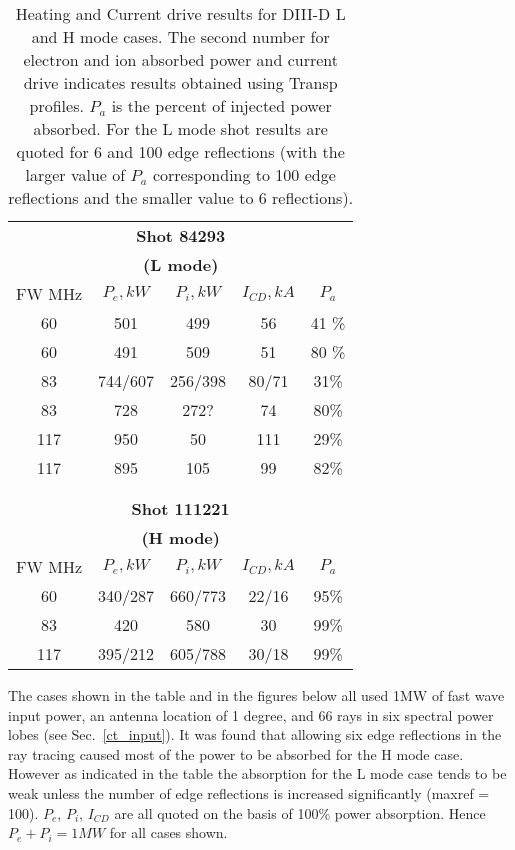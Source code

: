 \begin{table}
\begin{centering}
\begin{tabular}{ccccc}
\multicolumn{5}{c}{\bfseries Shot 84293} \\
\multicolumn{5}{c}{\bfseries (L mode) }  \\ 
FW MHz& $P_e ,kW $ & $P_i, kW  $ & $ I_{CD}, kA  $ & $P_a $ \\ \hline
60  & 501& 499 & 56& 41 \%  \\
60  & 491& 509 & 51& 80 \%  \\
83  & 744/607& 256/398  &  80/71 & 31\%   \\
83  & 728 & 272?   &  74 & 80\%   \\
117  &950  &50 & 111 & 29\%  \\
117  &895  &105 & 99 & 82\%  \\
\\ \hline
& \\
\multicolumn{5}{c}{\bfseries Shot 111221} \\
\multicolumn{5}{c}{\bfseries (H
  mode)} \\ 
FW MHz& $P_e, kW$ & $P_i ,kW $ & $ I_{CD}, kA $&  $P_a $ \\ \hline
60  &340/287& 660/773 & 22/16 & 95\% \\
83  & 420 & 580 & 30  & 99\% \\
117 & 395/212 & 605/788 & 30/18 & 99\% \\ \hline
\end{tabular}
\caption{Heating and Current drive results for DIII-D L and H
  mode cases. The second number for electron and ion absorbed power and
  current drive indicates results obtained using Transp
  profiles. $P_a$ is the percent of injected power absorbed. For the
L mode shot results are quoted for 6  and 100 edge reflections (with
the larger value of $P_a$ corresponding to 100 edge reflections and
the smaller value to 6 reflections).}
\label{t1}
\end{centering}
\end{table} 

The cases  shown in the table and in the figures below all used 1MW of
fast wave input power, an antenna location of 1 degree, and 66 rays in six
spectral power lobes (see Sec.~\ref{ct_input}). 
 It was found that allowing six edge reflections
in the ray tracing caused most of the power to be absorbed for the H
mode case. However as indicated in the table the absorption for
the L mode case tends to be weak unless the number of edge reflections
is increased significantly (maxref = 100). $P_e$, $P_i$, $I_{CD}$ are
all quoted on the basis of 100\% power absorption. Hence $P_e + P_i = 1
 MW $ for all cases shown.

